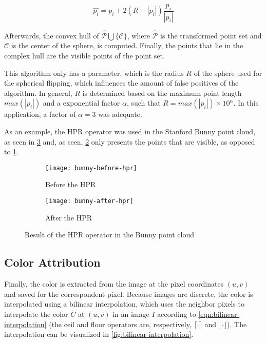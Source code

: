 \begin{equation}
    \label{eqn:spherical-flipping}
    \hat{p_i} = p_i + 2 (R - |p_i|) \frac{p_i}{|p_i|}
\end{equation}

Afterwards, the convex hull of $\hat{\mathcal{P}} \bigcup \{\mathcal{C}\}$, where $\hat{\mathcal{P}}$ is the transformed point set and $\mathcal{C}$ is the center of the sphere, is computed. Finally, the points that lie in the complex hull are the visible points of the point set.

This algorithm only has a parameter, which is the radius $R$ of the sphere used for the spherical flipping, which influences the amount of false positives of the algorithm. In general, $R$ is determined based on the maximum point length $max(|p_i|)$ and a exponential factor $\alpha$, such that $R = max(|p_i|) \times 10^{\alpha}$. In this application, a factor of $\alpha = 3$ was adequate.

As an example, the HPR operator was used in the Stanford Bunny point cloud, as seen in \cref{fig:hpr-operator-bunny} and, as seen, \cref{fig:after-hpr} only presents the points that are visible, as opposed to \cref{fig:before-hpr}.

\begin{figure}[h]
    
    \centering
    \begin{subfigure}{0.5\textwidth}
        \centering
        \texttt{[image: bunny-before-hpr]}
        \caption{Before the HPR}
        \label{fig:before-hpr}
    \end{subfigure}%
    \begin{subfigure}{0.5\textwidth}
        \centering
        \texttt{[image: bunny-after-hpr]}
        \caption{After the HPR}
        \label{fig:after-hpr}
    \end{subfigure}

    \caption{Result of the HPR operator in the Bunny point cloud}
    \label{fig:hpr-operator-bunny}

\end{figure}

\subsection{Color Attribution}

\newcommand\ceil[1]{\lceil #1 \rceil}
\newcommand\floor[1]{\lfloor #1 \rfloor}

Finally, the color is extracted from the image at the pixel coordinates $(u, v)$ and saved for the correspondent pixel. Because images are discrete, the color is interpolated using a bilinear interpolation, which uses the neighbor pixels to interpolate the color $C$ at $(u, v)$ in an image $I$ according to \cref{eqn:bilinear-interpolation} (the ceil and floor operators are, respectively, $\ceil{\cdot}$ and $\floor{\cdot}$). The interpolation can be visualized in \cref{fig:bilinear-interpolation}.

